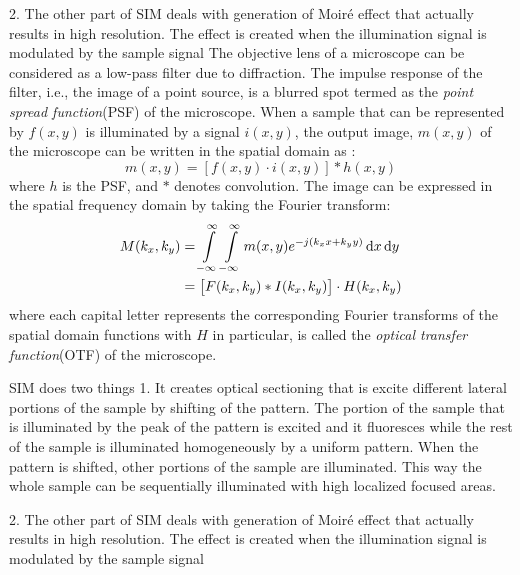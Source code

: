 \documentclass[11pt]{article}
\begin{document}
2. The other part of SIM deals with generation of Moiré effect that actually results in high resolution. The effect is created when the illumination signal is modulated by the sample signal
The objective lens of a microscope can be considered as a low-pass filter due to diffraction. The impulse response of the filter, i.e., the image of a point source, is a blurred spot termed as the \emph{point spread function}(PSF) of the microscope. When a sample that can be represented by $f(x,y)$ is illuminated by a signal $i(x,y)$, the output image, $m(x,y)$ of the microscope can be written in the spatial domain as \cite{Jost_2013}:
%
\begin{equation}
  m(x,y) = \left[ f(x,y) \cdot i(x,y) \right] \ast h(x,y)
  \label{eq:microscope}
\end{equation}
%
where $h$ is the PSF, and $\ast$ denotes convolution.
The image can be expressed in the spatial frequency domain by taking the Fourier transform:
%
\begin{equation}
  \begin{split}
    M(k_x, k_y) &= \int \limits_{-\infty}^{\infty} \int \limits_{-\infty}^{\infty}   m(x,y) e^{-j(k_x x + k_y y)} \mathop{}\!\mathrm{d}{x}\mathop{}\!\mathrm{d}{y} \\
    &=  \left[ F(k_x,k_y) \ast I(k_x,k_y) \right] \cdot H(k_x,k_y)
  \end{split}
  \label{eq:FT}
\end{equation}
%
where each capital letter represents the corresponding Fourier transforms of the spatial domain functions with $H$ in particular, is called the \emph{optical transfer function}(OTF) of the microscope.



SIM does two things
1. It creates optical sectioning that is excite different lateral portions of the sample by shifting of the pattern. The portion of the sample that is illuminated by the peak of the pattern is excited and it fluoresces while the rest of the sample is illuminated homogeneously by a uniform pattern. When the pattern is shifted, other portions of the sample are illuminated. This way the whole sample can be sequentially illuminated with high localized focused areas.

2. The other part of SIM deals with generation of Moiré effect that actually results in high resolution. The effect is created when the illumination signal is modulated by the sample signal
\end{document}
